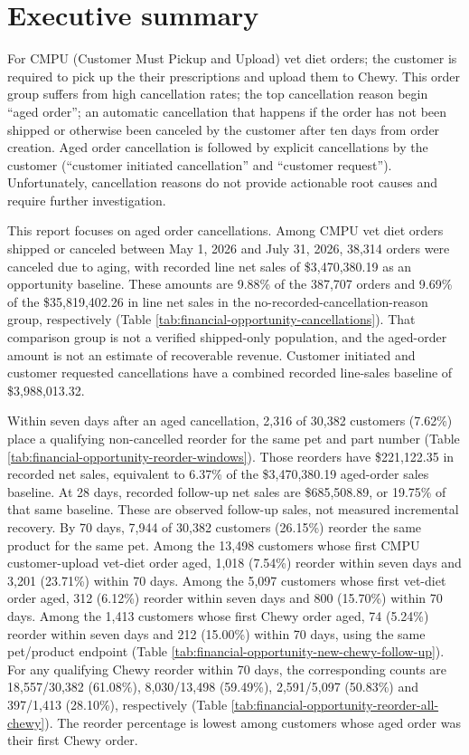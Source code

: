 \section{Executive summary}
\label{abstract}

For CMPU (Customer Must Pickup and Upload) vet diet orders; the
customer is required to pick up the their prescriptions and upload
them to Chewy. This order group suffers from high cancellation rates;
the top cancellation reason begin ``aged order''; an automatic
cancellation that happens if the order has not been shipped or
otherwise been canceled by the customer after ten days from order
creation. Aged order cancellation is followed by explicit
cancellations by the customer (``customer initiated cancellation'' and
``customer request''). Unfortunately, cancellation reasons
do not provide actionable root causes and require further
investigation.

This report focuses on aged order cancellations. Among CMPU vet diet
orders shipped or canceled between May 1, 2026 and July 31, 2026,
38,314 orders were canceled due to aging, with recorded line net sales
of \$3,470,380.19 as an opportunity baseline. These amounts are 9.88\%
of the 387,707 orders and 9.69\% of the \$35,819,402.26 in line net sales
in the no-recorded-cancellation-reason group, respectively (Table
\ref{tab:financial-opportunity-cancellations}). That comparison group
is not a verified shipped-only population, and the aged-order amount
is not an estimate of recoverable revenue. Customer initiated and
customer requested cancellations have a combined recorded line-sales
baseline of \$3,988,013.32.

Within seven days after an aged cancellation, 2,316 of 30,382 customers
(7.62\%) place a qualifying non-cancelled reorder for the same pet and
part number (Table \ref{tab:financial-opportunity-reorder-windows}).
Those reorders have \$221,122.35 in recorded net sales, equivalent to
6.37\% of the \$3,470,380.19 aged-order sales baseline. At 28 days,
recorded follow-up net sales are \$685,508.89, or 19.75\% of that same
baseline. These are observed follow-up sales, not measured incremental
recovery. By 70 days, 7,944 of 30,382 customers (26.15\%) reorder the
same product for the same pet.
Among the 13,498 customers whose first CMPU customer-upload vet-diet
order aged, 1,018 (7.54\%) reorder within seven days and 3,201 (23.71\%)
within 70 days. Among the 5,097 customers whose first vet-diet
order aged, 312 (6.12\%) reorder within seven days and 800 (15.70\%)
within 70 days. Among the 1,413 customers whose first Chewy
order aged, 74 (5.24\%) reorder within seven days and 212 (15.00\%)
within 70 days, using the same pet/product
endpoint (Table \ref{tab:financial-opportunity-new-chewy-follow-up}).
For any qualifying Chewy reorder within 70 days, the corresponding
counts are 18,557/30,382 (61.08\%), 8,030/13,498 (59.49\%),
2,591/5,097 (50.83\%) and 397/1,413 (28.10\%), respectively
(Table \ref{tab:financial-opportunity-reorder-all-chewy}).
The reorder percentage is lowest among customers whose aged order was
their first Chewy order.


